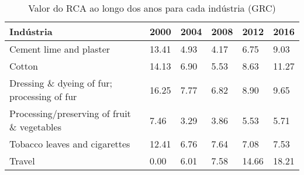 \begin{table}
\centering
\caption{Valor do RCA ao longo dos anos para cada indústria (GRC)}
\begin{tabular}{p{6cm}p{1.5cm}p{1.5cm}p{1.5cm}p{1.5cm}p{1.5cm}}
\toprule
                                  Indústria &  2000 & 2004 & 2008 &  2012 &  2016 \\
\midrule
                    Cement lime and plaster & 13.41 & 4.93 & 4.17 &  6.75 &  9.03 \\
                                     Cotton & 14.13 & 6.90 & 5.53 &  8.63 & 11.27 \\
Dressing \& dyeing of fur; processing of fur & 16.25 & 7.77 & 6.82 &  8.90 &  9.65 \\
Processing/preserving of fruit \& vegetables &  7.46 & 3.29 & 3.86 &  5.53 &  5.71 \\
              Tobacco leaves and cigarettes & 12.41 & 6.76 & 7.64 &  7.08 &  7.53 \\
                                     Travel &  0.00 & 6.01 & 7.58 & 14.66 & 18.21 \\
\bottomrule
\end{tabular}
\end{table}
